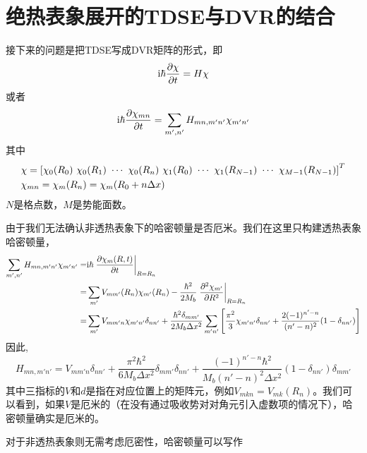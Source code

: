 \documentclass[UTF8,12pt]{article}
\begin{document}
    \section{绝热表象展开的TDSE与DVR的结合}
        接下来的问题是把TDSE写成DVR矩阵的形式，即
        \begin{equation}
            \mathrm{i}\hbar\pdv{\chi}{t}=H\chi
        \end{equation}
        或者
        \begin{equation}
            \mathrm{i}\hbar\pdv{\chi_{mn}}{t}=\sum_{m',n'}{H_{mn,m'n'}\chi_{m'n'}}
        \end{equation}
        其中
        \begin{align}
            &\chi=\qty[\chi_0(R_0)\ \chi_0(R_1)\ \cdots\ \chi_0(R_{n})\ \chi_1(R_0)\ \cdots\ \chi_1(R_{N-1})\ \cdots\ \chi_{M-1}(R_{N-1})]^T \\
            &\chi_{mn}=\chi_m(R_n)=\chi_m(R_0+n\Delta x)
        \end{align}
        $N$是格点数，$M$是势能面数。\par
        由于我们无法确认非透热表象下的哈密顿量是否厄米。我们在这里只构建透热表象哈密顿量，
        \begin{align}
            \sum_{m',n'}{H_{mn,m'n'}\chi_{m'n'}}=&\mathrm{i}\hbar\eval{\pdv{\chi_m(R,t)}{t}}_{R=R_n} \\
            =&\sum_{m'}{V_{mm'}(R_n)\chi_{m'}(R_n)}-\frac{\hbar^2}{2M_b}\eval{\pdv[2]{\chi_{m'}}{R}}_{R=R_n} \\
            =&\sum_{m'}{V_{mm'n}\chi_{m'n'}\delta_{nn'}}+\frac{\hbar^2\delta_{mm'}}{2M_b\Delta x^2}\sum_{m'n'}{\qty[\frac{\pi^2}{3}\chi_{m'n'}\delta_{nn'}+\frac{2(-1)^{n'-n}}{(n'-n)^2}(1-\delta_{nn'})]}
        \end{align}
        因此,
        \begin{equation}
            H_{mn,m'n'}=V_{mm'n}\delta_{nn'}+\frac{\pi^2\hbar^2}{6M_b\Delta x^2}\delta_{mm'}\delta_{nn'}+\frac{(-1)^{n'-n}\hbar^2}{M_b(n'-n)^2\Delta x^2}(1-\delta_{nn'})\delta_{mm'}
        \end{equation}
        其中三指标的$V$和$d$是指在对应位置上的矩阵元，例如$V_{mkn}=V_{mk}(R_n)$。我们可以看到，如果$V$是厄米的（在没有通过吸收势对对角元引入虚数项的情况下），哈密顿量确实是厄米的。\par
        对于非透热表象则无需考虑厄密性，哈密顿量可以写作
\end{document}
